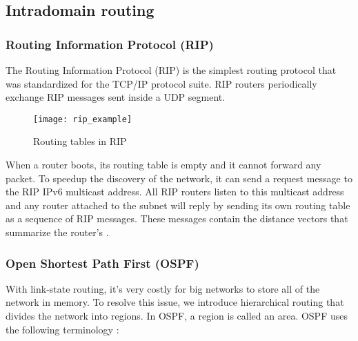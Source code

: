 \subsection{Intradomain routing}

\subsubsection[RIP]{Routing Information Protocol (RIP)}

The Routing Information Protocol (RIP) is the simplest routing protocol that was standardized for the TCP/IP protocol suite. RIP routers periodically exchange RIP messages sent inside a UDP segment.

\begin{minipage}{0.55\textwidth}
	\begin{figure}[H]
		\centering
		\texttt{[image: rip\_example]}
		\caption{Routing tables in RIP}
	\end{figure}
\end{minipage}
\begin{minipage}{0.44\textwidth}
	When a router boots, its routing table is empty and it cannot forward any packet. To speedup the discovery of the network, it can send a request message to the RIP IPv6 multicast address. All RIP routers listen to this multicast address and any router attached to the subnet will reply by sending its own routing table as a sequence of RIP messages. These messages contain the distance vectors that summarize the router’s .
\end{minipage}

\subsubsection[OSPF]{Open Shortest Path First (OSPF)}

With link-state routing, it’s very costly for big networks to store all of the network in memory. To resolve this issue, we introduce hierarchical routing that divides the network into regions. In OSPF, a region is called an area.
OSPF uses the following terminology :

